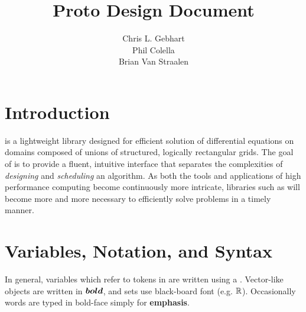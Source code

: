 \documentclass[12pt]{article}
\title{Proto Design Document}
\author{Chris L. Gebhart\\Phil Colella \\ Brian Van Straalen}
\begin{document}
\lstset{language=C++,style=protostyle}
\maketitle

\section{Introduction}

\libname is a lightweight library designed for efficient solution of differential equations on domains composed of unions of structured, logically rectangular grids. The goal of \libname is to provide a fluent, intuitive interface that separates the complexities of \textit{designing} and \textit{scheduling} an algorithm. As both the tools and applications of high performance computing become continuously more intricate, libraries such as \libname will become more and more necessary to efficiently solve problems in a timely manner. 

\section{Variables, Notation, and Syntax}

In general, variables which refer to tokens in \libname are written using a . Vector-like objects are written in ${\boldsymbol{bold}}$, and sets use black-board font (e.g. $\mathbb{R}$). Occasionally words are typed in bold-face simply for \textbf{emphasis}. 
\end{document}
